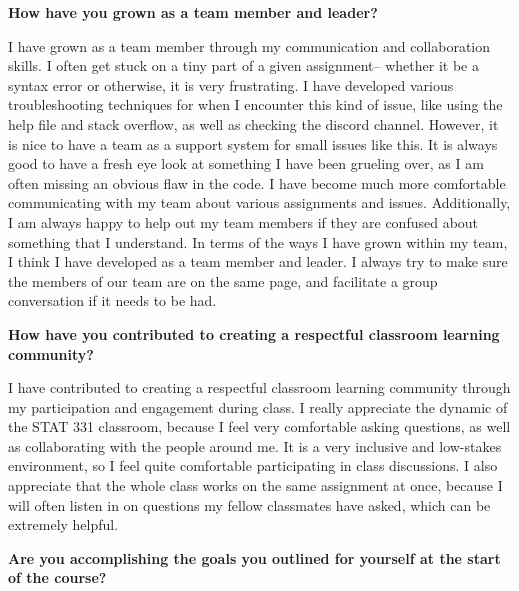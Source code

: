 \documentclass[
  letterpaper,
  DIV=11,
  numbers=noendperiod]{scrartcl}
\begin{document}
\textbf{How have you grown as a team member and leader?}

I have grown as a team member through my communication and collaboration
skills. I often get stuck on a tiny part of a given assignment-- whether
it be a syntax error or otherwise, it is very frustrating. I have
developed various troubleshooting techniques for when I encounter this
kind of issue, like using the help file and stack overflow, as well as
checking the discord channel. However, it is nice to have a team as a
support system for small issues like this. It is always good to have a
fresh eye look at something I have been grueling over, as I am often
missing an obvious flaw in the code. I have become much more comfortable
communicating with my team about various assignments and issues.
Additionally, I am always happy to help out my team members if they are
confused about something that I understand. In terms of the ways I have
grown within my team, I think I have developed as a team member and
leader. I always try to make sure the members of our team are on the
same page, and facilitate a group conversation if it needs to be had.

\textbf{How have you contributed to creating a respectful classroom
learning community?}

I have contributed to creating a respectful classroom learning community
through my participation and engagement during class. I really
appreciate the dynamic of the STAT 331 classroom, because I feel very
comfortable asking questions, as well as collaborating with the people
around me. It is a very inclusive and low-stakes environment, so I feel
quite comfortable participating in class discussions. I also appreciate
that the whole class works on the same assignment at once, because I
will often listen in on questions my fellow classmates have asked, which
can be extremely helpful.

\textbf{Are you accomplishing the goals you outlined for yourself at the
start of the course?}
\end{document}
